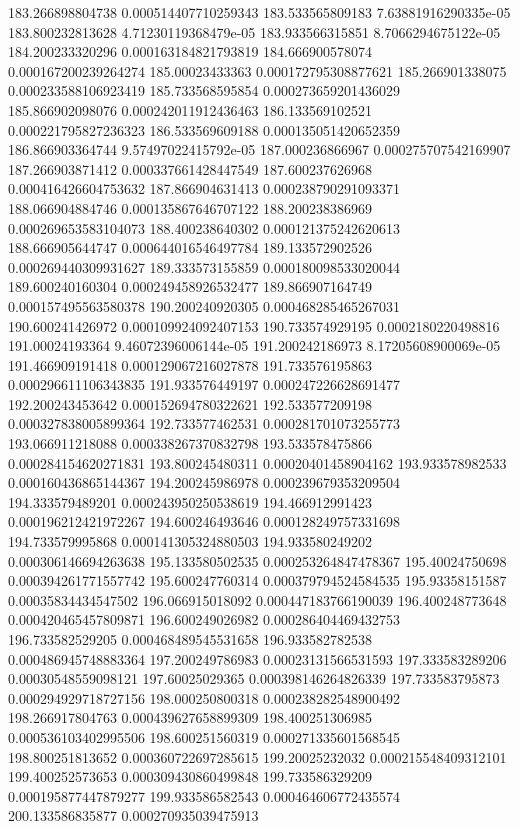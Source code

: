 {183.266898804738 0.000514407710259343
183.533565809183 7.63881916290335e-05
183.800232813628 4.71230119368479e-05
183.933566315851 8.7066294675122e-05
184.200233320296 0.000163184821793819
184.666900578074 0.000167200239264274
185.00023433363 0.000172795308877621
185.266901338075 0.000233588106923419
185.733568595854 0.000273659201436029
185.866902098076 0.000242011912436463
186.133569102521 0.000221795827236323
186.533569609188 0.000135051420652359
186.866903364744 9.57497022415792e-05
187.000236866967 0.000275707542169907
187.266903871412 0.000337661428447549
187.600237626968 0.000416426604753632
187.866904631413 0.000238790291093371
188.066904884746 0.000135867646707122
188.200238386969 0.000269653583104073
188.400238640302 0.000121375242620613
188.666905644747 0.000644016546497784
189.133572902526 0.000269440309931627
189.333573155859 0.000180098533020044
189.600240160304 0.000249458926532477
189.866907164749 0.000157495563580378
190.200240920305 0.000468285465267031
190.600241426972 0.000109924092407153
190.733574929195 0.0002180220498816
191.00024193364 9.46072396006144e-05
191.200242186973 8.17205608900069e-05
191.466909191418 0.000129067216027878
191.733576195863 0.000296611106343835
191.933576449197 0.000247226628691477
192.200243453642 0.000152694780322621
192.533577209198 0.000327838005899364
192.733577462531 0.000281701073255773
193.066911218088 0.000338267370832798
193.533578475866 0.000284154620271831
193.800245480311 0.00020401458904162
193.933578982533 0.000160436865144367
194.200245986978 0.000239679353209504
194.333579489201 0.000243950250538619
194.466912991423 0.000196212421972267
194.600246493646 0.000128249757331698
194.733579995868 0.000141305324880503
194.933580249202 0.000306146694263638
195.133580502535 0.000253264847478367
195.40024750698 0.000394261771557742
195.600247760314 0.000379794524584535
195.93358151587 0.00035834434547502
196.066915018092 0.000447183766190039
196.400248773648 0.000420465457809871
196.600249026982 0.000286404469432753
196.733582529205 0.000468489545531658
196.933582782538 0.000486945748883364
197.200249786983 0.00023131566531593
197.333583289206 0.00030548559098121
197.60025029365 0.000398146264826339
197.733583795873 0.000294929718727156
198.000250800318 0.000238282548900492
198.266917804763 0.000439627658899309
198.400251306985 0.000536103402995506
198.600251560319 0.000271335601568545
198.800251813652 0.000360722697285615
199.20025232032 0.000215548409312101
199.400252573653 0.000309430860499848
199.733586329209 0.000195877447879277
199.933586582543 0.000464606772435574
200.133586835877 0.000270935039475913
}
